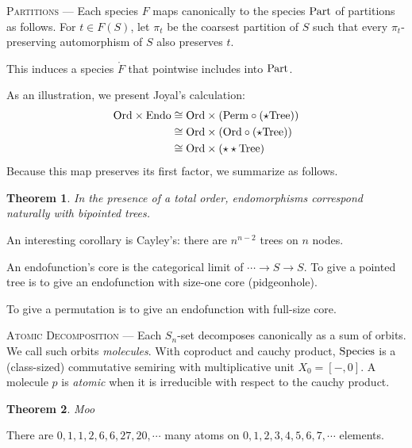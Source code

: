 \documentclass[12pt, justified]{tufte-book}
\newtheorem*{thm}{Theorem}
\theoremstyle{definition}
\newcommand{\mpar}[1]{\vspace{0.5cm}\par\noindent\textsc{#1} --- }
\begin{document}
      \mpar{Partitions}
        Each species $F$ maps canonically to the species ${\rm Part}$ of
        partitions as follows.  For $t\in F(S)$, let $\pi_t$ be the coarsest
        partition of $S$ such that every $\pi_t$-preserving automorphism of $S$
        also preserves $t$.

        This induces a species $\mathring{F}$ that pointwise includes into
        ${\rm Part}$.   

        As an illustration, we present Joyal's calculation:
        \begin{align*}
            {\rm Ord}\times {\rm Endo}
&\cong
            {\rm Ord}\times ({\rm Perm} \circ (\star{\rm Tree}))
\\&\cong        
            {\rm Ord}\times ({\rm Ord} \circ (\star{\rm Tree}))
\\&\cong
            {\rm Ord}\times (\star\star{\rm Tree})
        \end{align*}
        Because this map preserves its first factor, we summarize as follows.
        \begin{thm}
          In the presence of a total order, endomorphisms correspond naturally
          with bipointed trees.
        \end{thm}
        An interesting corollary is Cayley's: there are $n^{n-2}$ trees on $n$
        nodes.
        
        An endofunction's core is the categorical limit of $\cdots\to S\to S$.
        To give a pointed tree is to give an endofunction with size-one core
        (pidgeonhole).

        To give a permutation is to give an endofunction with full-size core.

      \mpar{Atomic Decomposition}
        Each $S_n$-set decomposes canonically as a sum of orbits.  We call such
        orbits \emph{molecules}.  With coproduct and cauchy product, ${\rm
        Species}$ is a (class-sized) commutative semiring with multiplicative
        unit $X_0 = [- , 0]$. 
        A molecule $p$ is \emph{atomic} when it is irreducible with respect 
        to the cauchy product.

        \begin{thm}
            Moo
        \end{thm}

        There are $0, 1, 1, 2, 6, 6, 27, 20, \cdots$ many atoms on 
        $0, 1, 2, 3, 4, 5, 6, 7, \cdots$ elements.
\end{document}
